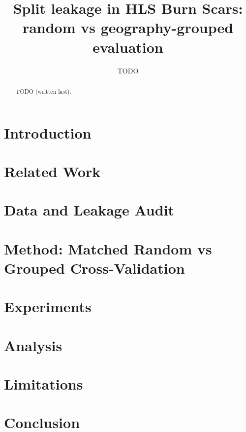 \documentclass[11pt]{article}
\title{Split leakage in HLS Burn Scars: random vs geography-grouped evaluation}
\author{TODO}
\begin{document}
\maketitle
\begin{abstract}
TODO (written last).
\end{abstract}
\section{Introduction}
\section{Related Work}
\section{Data and Leakage Audit}
\section{Method: Matched Random vs Grouped Cross-Validation}
\section{Experiments}
\section{Analysis}
\section{Limitations}
\section{Conclusion}


\end{document}
